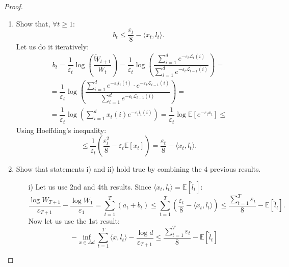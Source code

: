 \documentclass[12pt]{report}
\begin{document}
\begin{proof}
\begin{enumerate}
        \item Show that, $\forall t \geq 1$:
        \[
            b_t \leq \dfrac{\varepsilon_t}{8} - \langle x_t, l_t \rangle . 
        \]
        Let us do it iteratively:
        \[
            \begin{array}{c}
                \displaystyle b_t = \dfrac{1}{\varepsilon_t} \log \left(\dfrac{\widetilde{W}_{t+1}}{W_t}\right) = \dfrac{1}{\varepsilon_t} \log \left(\dfrac{\displaystyle \sum\limits_{i=1}^{d} e^{\displaystyle -\varepsilon_t \mathcal{L}_t (i)}}{\displaystyle \sum\limits_{i=1}^{d} e^{\displaystyle - \varepsilon_{t}\mathcal{L}_{t-1}(i)}} \right) = 
            \end{array}  
        \]
        \[
            \begin{array}{c}
                \displaystyle = \dfrac{1}{\varepsilon_t} \log \left(\dfrac{\displaystyle \sum\limits_{i=1}^{d} e^{\displaystyle - \varepsilon_t l_t (i)} \cdot e^{\displaystyle - \varepsilon_t\mathcal{L}_{t-1}(i)}}{\displaystyle \sum\limits_{i=1}^{d} e^{\displaystyle - \varepsilon_{t}\mathcal{L}_{t-1}(i)}}\right) = \\[1cm]
                \displaystyle = \dfrac{1}{\varepsilon_t} \log \left( \sum\limits_{i=1}^d x_t(i) e^{\displaystyle -\varepsilon_t l_t(i)}\right) = \dfrac{1}{\varepsilon_t} \log \mathbb{E}\left[e^{\displaystyle -\varepsilon_t x_t}\right] \leq
            \end{array}  
        \]
        Using Hoeffding's inequality:
        \[
            \leq \dfrac{1}{\varepsilon_t} \left(\dfrac{\varepsilon_t^2}{8} - \varepsilon_t \mathbb{E}[x_t]\right) = \dfrac{\varepsilon_t}{8} - \langle x_t, l_t \rangle.    
        \]
        \item Show that statements i) and ii) hold true by combining the 4 previous results.
        \par 
        \begin{itemize}
            \item[i)] Let us use 2nd and 4th results. Since $\langle x_t, l_t \rangle = \mathbb{E}[\hat{l}_t]$:
            \[
                \dfrac{\log W_{T+1}}{\varepsilon_{T+1}} - \dfrac{\log W_1}{\varepsilon_1} = \sum\limits_{t=1}^T (a_t + b_t) \leq \sum\limits_{t=1}^T \left(\dfrac{\varepsilon_t}{8} - \langle x_t, l_t \rangle\right) \leq  \dfrac{\displaystyle \sum\limits_{t=1}^T \varepsilon_t}{8} - \mathbb{E}[\hat{l}_t].
            \]
            Now let us use the 1st result:
            \[
                -\inf\limits_{x \in \Delta d} \sum\limits_{t=1}^T \langle x, l_t \rangle - \dfrac{\log d}{\varepsilon_{T+1}} \leq  \dfrac{\displaystyle \sum\limits_{t=1}^T \varepsilon_t}{8} - \mathbb{E}[\hat{l}_t]
\]
\end{itemize}
\end{enumerate}
\end{proof}
\end{document}
